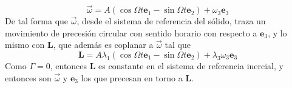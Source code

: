 \begin{equation} \label{6.1.1}
    \vec{\omega} = A(\cos\Omega t \mathbf{e}_1 - \sin\Omega t \mathbf{e}_2) + \omega_3 \mathbf{e}_3
\end{equation}
\newpage
De tal forma que $\vec{\omega}$, desde el sistema de referencia del sólido, traza un movimiento de precesión circular con sentido horario con respecto a $\mathbf{e}_3$, y lo mismo con $\mathbf{L}$, que además es coplanar a $\vec{\omega}$ tal que
\begin{equation} \label{6.1.1}
    \mathbf{L} = A\lambda_1(\cos\Omega t \mathbf{e}_1 - \sin\Omega t \mathbf{e}_2) + \lambda_3 \omega_3 \mathbf{e}_3
\end{equation}
Como $\mathcal{\Gamma} = 0$, entonces $\mathbf{L}$ es constante en el sistema de referencia inercial, y entonces son $\vec{\omega}$ y $\mathbf{e}_3$ los que precesan en torno a $\mathbf{L}$.
